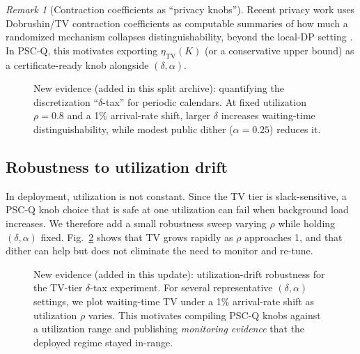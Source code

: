 \documentclass[11pt]{article}
\theoremstyle{definition}
\theoremstyle{remark}
\newtheorem{remark}{Remark}
\newcommand{\TV}{\mathrm{TV}}
\begin{document}
\begin{remark}[Contraction coefficients as ``privacy knobs'']
Recent privacy work uses Dobrushin/TV contraction coefficients as computable summaries of how much a randomized mechanism collapses distinguishability, beyond the local-DP setting \cite{grosse2026}.
In PSC-Q, this motivates exporting \(\eta_{\TV}(K)\) (or a conservative upper bound) as a certificate-ready knob alongside \((\delta,\alpha)\).
\end{remark}


\begin{figure}[t]
\centering
{}
\caption{New evidence (added in this split archive): quantifying the discretization ``$\delta$-tax'' for periodic calendars.
At fixed utilization $\rho=0.8$ and a 1\% arrival-rate shift, larger $\delta$ increases waiting-time distinguishability, while modest public dither ($\alpha=0.25$) reduces it.}
\label{fig:deltatax}
\end{figure}

\subsection{Robustness to utilization drift}
In deployment, utilization is not constant.
Since the TV tier is slack-sensitive, a PSC-Q knob choice that is safe at one utilization can fail when background load increases.
We therefore add a small robustness sweep varying $\rho$ while holding $(\delta,\alpha)$ fixed.
Fig.~\ref{fig:drift} shows that TV grows rapidly as $\rho$ approaches 1, and that dither can help but does not eliminate the need to monitor and re-tune.

\begin{figure}[t]
\centering
{}
\caption{New evidence (added in this update): utilization-drift robustness for the TV-tier $\delta$-tax experiment.
For several representative $(\delta,\alpha)$ settings, we plot waiting-time TV under a 1\% arrival-rate shift as utilization $\rho$ varies.
This motivates compiling PSC-Q knobs against a utilization range and publishing \emph{monitoring evidence} that the deployed regime stayed in-range.}
\label{fig:drift}
\end{figure}
\end{document}
